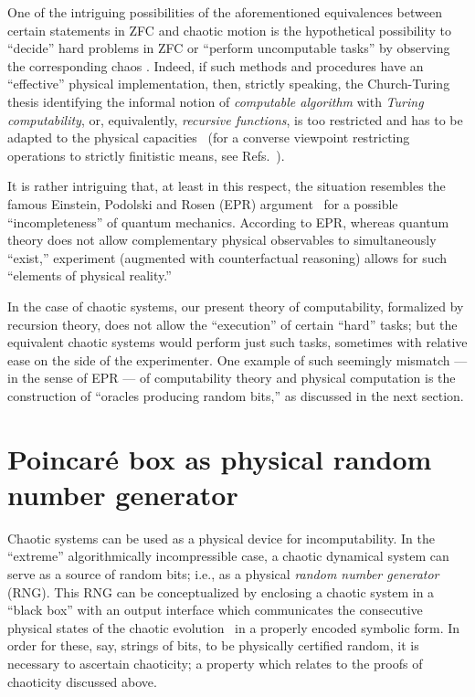 \documentclass[
aip,
cha,
amssymb
]{revtex4-1}
\begin{document}
One of the intriguing possibilities of the aforementioned equivalences between certain statements in ZFC and chaotic motion is
the hypothetical possibility to ``decide'' hard problems in ZFC
or ``perform uncomputable tasks'' by observing the corresponding chaos \cite{Scarpellini-63,Stewart-91,dc-d93,Scarpellini-2003,Scarpellini-2003c}.
Indeed, if such methods and procedures have an ``effective'' physical implementation,
then, strictly speaking, the Church-Turing thesis identifying the informal notion of {\em computable algorithm}
with {\em Turing computability}, or, equivalently, {\em recursive functions}, is too restricted and has to be adapted to the
physical capacities~\cite{davis-58,rogers1,kreisel} (for a converse  viewpoint restricting operations to strictly finitistic means,
see Refs.~\cite{bridgman,gandy2,gandy1}).

It is rather intriguing that, at least in this respect, the situation resembles the famous Einstein, Podolski and Rosen (EPR) argument~\cite{epr} for
a possible ``incompleteness'' of quantum mechanics.
According to EPR, whereas quantum theory does not allow complementary physical observables to simultaneously ``exist,''
experiment (augmented with counterfactual reasoning) allows for such ``elements of physical reality.''

In the case of chaotic systems, our present theory of computability,
formalized by recursion theory, does not allow the ``execution'' of certain ``hard'' tasks;
but the equivalent chaotic systems would perform just such tasks, sometimes with relative ease on the side of the experimenter.
One example of such seemingly mismatch --- in the sense of EPR --- of computability theory and physical computation is the construction of
``oracles producing random bits,'' as discussed in the next section.



\section{Poincar\'e box as physical random number generator}

Chaotic systems can be used as a physical device for incomputability.
In the ``extreme'' algorithmically incompressible case, a chaotic dynamical system can serve
as a source of random bits; i.e., as a physical {\em random number generator} (RNG).
This RNG can be conceptualized by enclosing a chaotic system in a ``black box'' with an output interface
which communicates the consecutive physical states of the chaotic evolution~\cite{PhysRevLett.45.712} in a properly encoded symbolic form.
In order for these, say, strings of bits, to be physically certified random, it is necessary to ascertain chaoticity;
a property which relates to the proofs of chaoticity discussed above.
\end{document}

